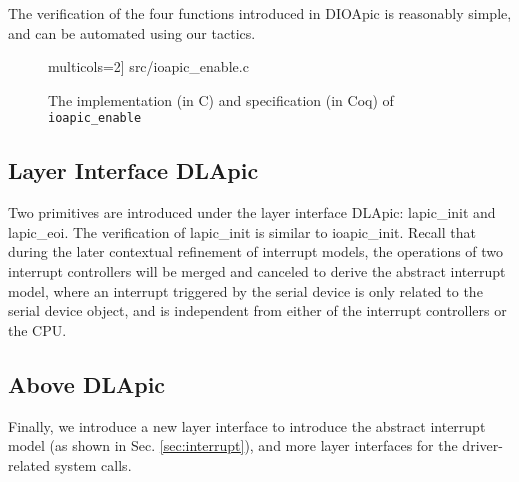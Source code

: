 The verification of the four functions introduced in DIOApic is reasonably
simple, and can be automated using our tactics.

\begin{figure}
	 multicols=2] {src/ioapic_enable.c}
	\caption{The implementation (in C) and specification (in Coq) of \texttt{ioapic\_enable}}
	\label{fig:ioapic_enable_v}
\end{figure}

\subsection{Layer Interface DLApic}

Two primitives are introduced under the layer interface DLApic:
\textsf{lapic\_init} and \textsf{lapic\_eoi}. The verification of
\textsf{lapic\_init} is similar to \textsf{ioapic\_init}. Recall that during the
later contextual refinement of interrupt models, the operations of two interrupt
controllers will be merged and canceled to derive the abstract interrupt model,
where an interrupt triggered by the serial device is only related to the serial
device object, and is independent from either of the interrupt controllers or
the CPU.


\subsection{Above DLApic}

Finally, we introduce a new layer interface to introduce the abstract interrupt
model (as shown in Sec. \ref{sec:interrupt}), and more layer interfaces
for the driver-related system calls.




